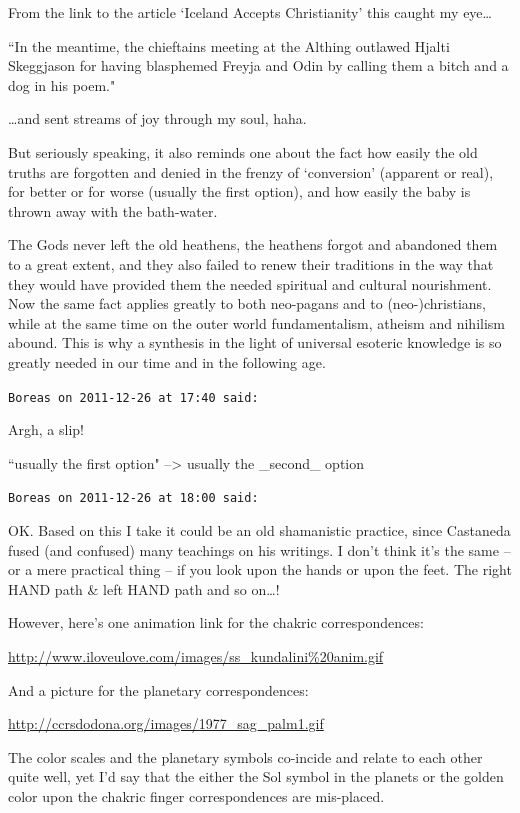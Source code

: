 \begin{footnotesize}
\begin{sffamily}
From the link to the article `Iceland Accepts Christianity' this caught my eye…

``In the meantime, the chieftains meeting at the Althing outlawed Hjalti Skeggjason for having blasphemed Freyja and Odin by calling them a bitch and a dog in his poem."

…and sent streams of joy through my soul, haha.

But seriously speaking, it also reminds one about the fact how easily the old truths are forgotten and denied in the frenzy of `conversion' (apparent or real), for better or for worse (usually the first option), and how easily the baby is thrown away with the bath-water.

The Gods never left the old heathens, the heathens forgot and abandoned them to a great extent, and they also failed to renew their traditions in the way that they would have provided them the needed spiritual and cultural nourishment. Now the same fact applies greatly to both neo-pagans and to (neo-)christians, while at the same time on the outer world fundamentalism, atheism and nihilism abound. This is why a synthesis in the light of universal esoteric knowledge is so greatly needed in our time and in the following age.


\hfill

\texttt{Boreas on 2011-12-26 at 17:40 said: }

Argh, a slip!

``usually the first option" –{\textgreater} usually the \_second\_ option


\hfill

\texttt{Boreas on 2011-12-26 at 18:00 said: }

OK. Based on this I take it could be an old shamanistic practice, since Castaneda fused (and confused) many teachings on his writings. I don't think it's the same – or a mere practical thing – if you look upon the hands or upon the feet. The right HAND path \& left HAND path and so on…!

However, here's one animation link for the chakric correspondences:

\url{http://www.iloveulove.com/images/ss\_kundalini\%20anim.gif}

And a picture for the planetary correspondences:

\url{http://ccrsdodona.org/images/1977\_sag\_palm1.gif}

The color scales and the planetary symbols co-incide and relate to each other quite well, yet I'd say that the either the Sol symbol in the planets or the golden color upon the chakric finger correspondences are mis-placed.


\end{sffamily}
\end{footnotesize}
